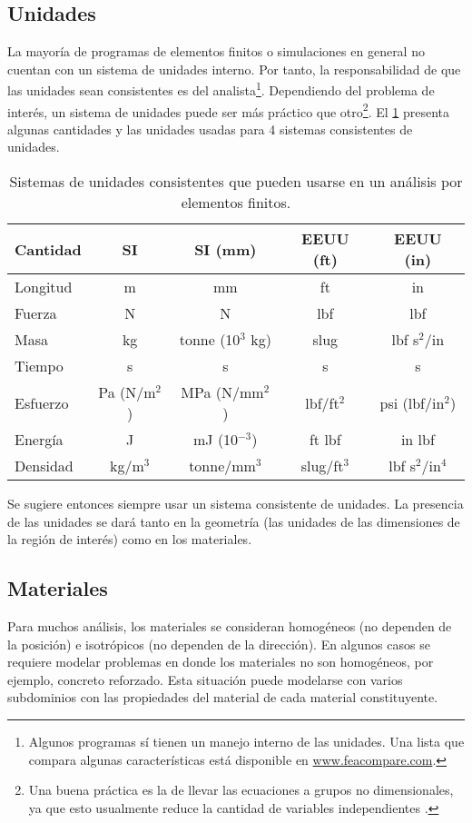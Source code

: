 \subsection{Unidades}
La mayoría de programas de elementos finitos o simulaciones en general no cuentan con un sistema de unidades interno. Por tanto, la responsabilidad de que las unidades sean consistentes es del analista\footnote{Algunos programas sí tienen un manejo interno de las unidades. Una lista que compara algunas características está disponible en \url{www.feacompare.com}.}. Dependiendo del problema de interés, un sistema de unidades puede ser más práctico que otro\footnote{Una buena práctica es la de llevar las ecuaciones a grupos no dimensionales, ya que esto usualmente reduce la cantidad de variables independientes \cite{book:langtangen2016scaling}.}. El \cref{tab:sistema_unidades} presenta algunas cantidades y las unidades usadas para 4 sistemas consistentes de unidades.
\begin{table}[H]
\centering
\begin{tabular}{lcccc}
\hline 
\textbf{Cantidad} & \textbf{SI} & \textbf{SI (mm)} & \textbf{EEUU (ft)} & \textbf{EEUU (in)} \\ 
\hline 
Longitud & m & mm & ft & in \\ 
Fuerza & N & N & lbf & lbf \\ 
Masa & kg & tonne (10$^3$ kg) & slug & lbf s$^2$/in \\ 
Tiempo & s & s & s & s \\ 
Esfuerzo & Pa (N/m$^2$) & MPa (N/mm$^2$) & lbf/ft$^2$ & psi (lbf/in$^2$) \\ 
Energía & J & mJ (10$^{-3}$) & ft lbf & in lbf \\ 
Densidad & kg/m$^3$ & tonne/mm$^3$ & slug/ft$^3$ & lbf s$^2$/in$^4$ \\ 
\hline 
\end{tabular}
\caption{Sistemas de unidades consistentes que pueden usarse en un análisis por elementos finitos.}
\label{tab:sistema_unidades}
\end{table}

Se sugiere entonces siempre usar un sistema consistente de unidades. La presencia de las unidades se dará tanto en la geometría (las unidades de las dimensiones de la región de interés) como en los materiales.

\subsection{Materiales}
Para muchos análisis, los materiales se consideran homogéneos (no dependen de la posición) e isotrópicos (no dependen de la dirección). En algunos casos se requiere  modelar problemas en donde los materiales no son homogéneos, por ejemplo, concreto reforzado. Esta situación puede modelarse con varios subdominios con las propiedades del material de cada material constituyente.

